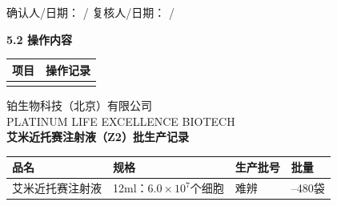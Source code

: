 \documentclass[UTF8,10pt,a4paper,fontset=fandol]{ctexart}
\newcommand{\fieldvalue}[1]{#1}
\newcommand{\handwritten}[1]{#1}
\begin{document}
\vspace{0.4em}

确认人/日期：
\fieldvalue{\handwritten{/}}
\hfill
复核人/日期：
\fieldvalue{\handwritten{/}}

\medskip
\textbf{5.2 操作内容}

\begin{tabularx}{\textwidth}{|X|X|}
\hline
项目 & 操作记录\\
\hline
 & \\
\hline
\end{tabularx}


\newpage

\begin{center}
\small
铂生物科技（北京）有限公司\\
{\tiny PLATINUM LIFE EXCELLENCE BIOTECH}\\[2pt]
\textbf{艾米近托赛注射液（Z2）批生产记录}
\end{center}

\noindent
\begin{tabularx}{\textwidth}{|>{\centering\arraybackslash}p{}|>{\centering\arraybackslash}p{}|>{\centering\arraybackslash}p{}|>{\centering\arraybackslash}X|}
\hline
品名 & 规格 & 生产批号 & 批量\\
\hline
艾米近托赛注射液 & 12ml：$6.0\times10^{7}$个细胞 &
\fieldvalue{\handwritten{难辨}} &
200--480袋\\
\hline
\end{tabularx}

\vspace{2pt}
\end{document}
